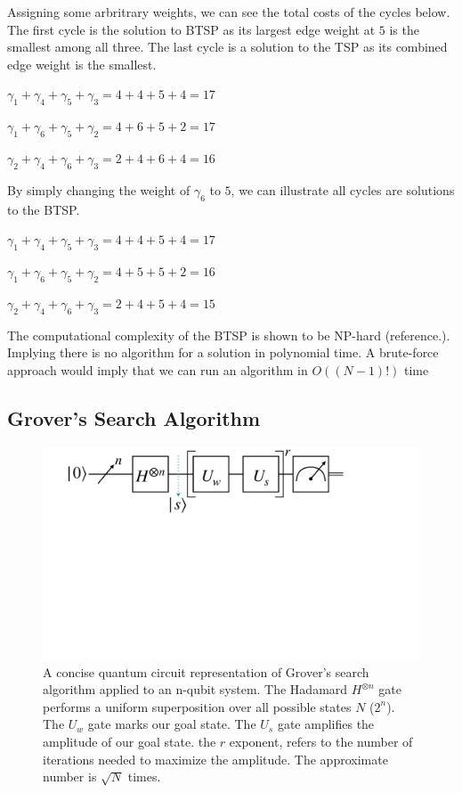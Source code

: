 \documentclass[twocolumn,showpacs,preprintnumbers,amsmath,amssymb]{revtex4}
\begin{document}
		Assigning some arbritrary weights, we can see the total costs of the cycles below. The first cycle is the solution to BTSP as its largest edge weight at $5$ is the smallest among all three. The last cycle is a solution to the TSP as its combined edge weight is the smallest.
		\begin{center}
		$\gamma_1 + \gamma_4 + \gamma_5 + \gamma_3 = 4 + 4 + 5 + 4 = 17$
		
		$ \gamma_1 + \gamma_6 + \gamma_5 + \gamma_2 = 4 + 6 + 5 + 2 = 17$
		
		$  \gamma_2 + \gamma_4 + \gamma_6 + \gamma_3 = 2 + 4 + 6 + 4 = 16$
		\end{center}
		

		By simply changing the weight of $\gamma_6$ to $5$, we can illustrate all cycles are solutions to the BTSP. 
		
		\begin{center}

			$\gamma_1 + \gamma_4 + \gamma_5 + \gamma_3 = 4 + 4 + 5 + 4 = 17$
			
			$ \gamma_1 + \gamma_6 + \gamma_5 + \gamma_2 = 4 + 5 + 5 + 2 = 16$
			
			$  \gamma_2 + \gamma_4 + \gamma_6 + \gamma_3 = 2 + 4 + 5 + 4 = 15$
		\end{center}
		
		The computational complexity of the BTSP is shown to be NP-hard (reference.). Implying there is no algorithm for a solution in polynomial time. A brute-force approach would imply that we can run an algorithm in $O((N-1)!)$ time
	
		
		\subsection{Grover's Search Algorithm}
		
		\begin{figure}[!h]
			\centering
			\includegraphics[trim={4.5cm 26cm 15cm 0},clip, width=0.99 \linewidth]{"graphics/grov_circ"}
			\caption{A concise quantum circuit representation of Grover's search algorithm applied to an n-qubit system. The Hadamard $H^{\otimes n }$ gate performs a uniform superposition over all possible states $N$ ($2^n$). The $U_w$ gate marks our goal state. The $U_s$ gate amplifies the amplitude of our goal state. the $r$ exponent, refers to the number of iterations needed to maximize the amplitude. The approximate number is $\sqrt{N}$ times.}
			\label{fig:grovercircuit}
		\end{figure}
		
\end{document}
